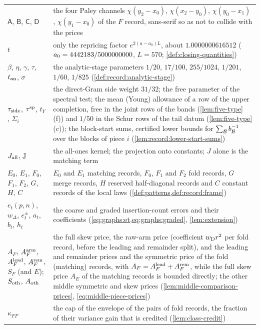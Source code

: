 \begin{longtable}{@{}>{\raggedright\arraybackslash}p{}%
>{\raggedright\arraybackslash}p{}@{}}
$\mathsf A$, $\mathsf B$, $\mathsf C$, $\mathsf D$ & the four Paley channels
 $\chi(y_2-x_0)$, $\chi(x_2-y_0)$, $\chi(y_0-x_1)$, $\chi(y_1-x_0)$ of the $F$
 record, sans-serif so as not to collide with the prices\\
$t$ & only the repricing factor $e^{2(a-a_0)L}$, about $1.0000000616512$
 ($a_0=4442183/5000000000$, $L=570$; \cref{def:closing-quantities})\\
$\beta$, $\eta$, $\gamma$, $\tau$, $t_{\rm an}$, $\sigma$ & the analytic-stage
 parameters $1/20$, $17/100$, $255/1024$, $1/201$, $1/60$, $1/825$
 (\cref{def:record:analytic-stage})\\
$\tau_{\mathrm{side}}$, $\tau^{\rm sp}$, $t_Y$, $\Sigma_i$ & the direct-Gram side weight
 $31/32$; the free parameter of the spectral test; the mean (Young) allowance
 of a row of the upper completion, free in the joint rows of the bands
 (\cref{lem:five-type}(f)) and $1/50$ in the Schur rows of the tail datum
 (\cref{lem:five-type}(c)); the block-start sums, certified lower bounds for $\sum_{\mathcal B}b_\mathcal B^{-1}$ over the blocks of piece $i$ (\cref{lem:record:lower-start-sums})\\
$J_{\mathrm{all}}$, $\mathbb J$ & the all-ones kernel; the projection onto constants; $J$
 alone is the matching term\\
$E_0$, $E_1$, $F_0$, $F_1$, $F_2$, $G$, $H$, $C$ & $E_0$ and $E_1$ matching records, $F_0$, $F_1$ and $F_2$ fold records,
 $G$ merge records, $H$ reserved half-diagonal records and $C$ constant records of the local laws (\cref{def:patterns,def:record:frame})\\
$e_t(p,n)$, $w_\Delta$, $e^\pm_t$, $a_t$, $b_t$, $h_t$ & the coarse and graded
 insertion-count errors and their coefficients
 (\cref{eq:graphs:et,eq:graphs:graded}, \cref{lem:extension})\\
$A_F$, $A^{\rm arm}_F$, $A^{\rm lead}_F$, $A^{\rm rem}_F$, $S_F$ (and $E$);
 $S_{\rm oth}$, $A_{\rm oth}$ & the full skew price, the raw-arm price (coefficient $w_{\rm D}r^2$ per fold
 record, before the leading and remainder split), and the leading and remainder prices and the symmetric price of the fold (matching) records, with
 $A_F=A^{\rm lead}_F+A^{\rm rem}_F$, while the full skew price $A_E$ of the
 matching records is bounded directly; the other middle symmetric and skew
 prices (\cref{lem:middle-comparison-prices}, \eqref{eq:middle-piece-prices})\\
$\kappa_{FF}$ & the cap of the envelope of the pairs of fold records, the
 fraction of their variance gain that is credited (\cref{lem:class-credit})\\

\end{longtable}
